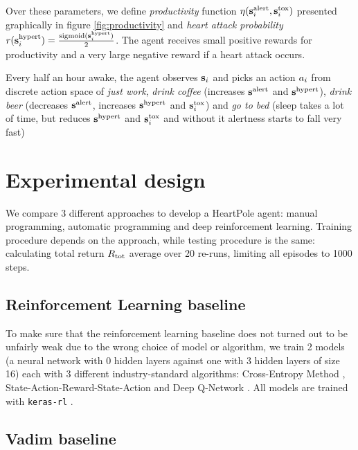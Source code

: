 Over these parameters, we define \emph{productivity} function $\eta(\textbf{s}^\text{alert}_i, \textbf{s}^\text{tox}_i)$ presented graphically in figure \ref{fig:productivity} and \emph{heart attack probability} $r(\textbf{s}^\text{hypert}_i)=\frac{\text{sigmoid}(\textbf{s}^\text{hypert}_i)}{2}$.
The agent receives small positive rewards for productivity and a very large negative reward if a heart attack occurs.

Every half an hour awake, the agent observes $\textbf{s}_i$ and picks an action $a_i$ from discrete action space of \emph{just work}, \emph{drink coffee} (increases $\textbf{s}^\text{alert}$ and $\textbf{s}^\text{hypert}$), \emph{drink beer} (decreases $\textbf{s}^\text{alert}$, increases $\textbf{s}^\text{hypert}$ and $\textbf{s}^\text{tox}_i$) and \emph{go to bed} (sleep takes a lot of time, but reduces $\textbf{s}^\text{hypert}$ and $\textbf{s}^\text{tox}_i$ and without it alertness starts to fall very fast)

\newpage
\section{Experimental design}
\label{sec:heartpole-experiments}

We compare 3 different approaches to develop a HeartPole agent: manual programming, automatic programming and deep reinforcement learning.
Training procedure depends on the approach, while testing procedure is the same: calculating total return $R_\text{tot}$ average over 20 re-runs, limiting all episodes to 1000 steps.

\subsection{Reinforcement Learning baseline}
To make sure that the reinforcement learning baseline does not turned out to be unfairly weak due to the wrong choice of model or algorithm, we train 2 models (a neural network with 0 hidden layers against one with 3 hidden layers of size 16) each with 3 different industry-standard algorithms: Cross-Entropy Method \cite{szitaLearningTetrisUsing2006}, State-Action-Reward-State-Action \cite[Chapter 6]{suttonReinforcementLearningSecond2018} and Deep Q-Network \cite{mnihPlayingAtariDeep2013,mnihHumanlevelControlDeep2015}.
All models are trained with \texttt{keras-rl} \cite{KerasrlKerasrlDeep2025}. 

\subsection{Vadim baseline}

